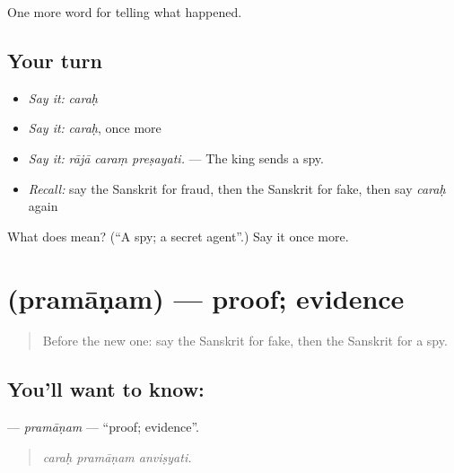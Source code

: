 \begin{grammarlens}[title={What you've built}]
One more word for telling what happened.
\end{grammarlens}

\subsection*{Your turn}
\begin{itemize}
\raggedright
  \item \emph{Say it:} \emph{caraḥ}
  \item \emph{Say it:} \emph{caraḥ}, once more
  \item \emph{Say it:} \emph{rājā caraṃ preṣayati.} — The king sends a spy.
  \item \emph{Recall:} say the Sanskrit for fraud, then the Sanskrit for fake, then say \emph{caraḥ} again
\end{itemize}

\begin{tcolorbox}[breakable,colback=teal!4,colframe=teal!35!black,title={Before you move on}]
What does  mean? (\textquotedblleft{}A spy; a secret agent\textquotedblright{}.) Say it once more.
\end{tcolorbox}
\section[\texorpdfstring{\sk{प्रमाणम्} (pramāṇam)}{प्रमाणम् (pramāṇam)}]{ (pramāṇam) — proof; evidence}

\label{lesson:SA-C292-pramanam}



\begin{quote}
Before the new one: say the Sanskrit for fake, then the Sanskrit for a spy.
\end{quote}

\subsection*{You'll want to know: }
\textbf{} — \emph{pramāṇam} — \textquotedblleft{}proof; evidence\textquotedblright{}.

\begin{quote}
  
\end{quote}

\begin{quote}
\emph{caraḥ pramāṇam anviṣyati.}
\end{quote}

